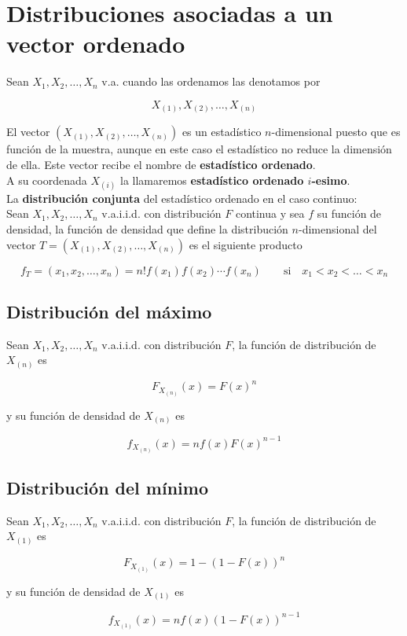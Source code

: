 \section{Distribuciones asociadas a un vector ordenado}


Sean $X_1, X_2, \dots, X_n$ v.a. cuando las ordenamos las denotamos por

\[ X_{(1)}, X_{(2)}, \dots, X_{(n)} \]

El vector $(X_{(1)}, X_{(2)}, \dots, X_{(n)})$ es un estadístico $n$-dimensional puesto que es función de la muestra, aunque en este caso el estadístico
no reduce la dimensión de ella. Este vector recibe el nombre de \textbf{estadístico ordenado}. \\
A su coordenada $X_{(i)}$ la llamaremos \textbf{estadístico ordenado $i$-esimo}. \\

La \textbf{distribución conjunta} del estadístico ordenado en el caso continuo: \\
Sean $X_1, X_2, \dots, X_n$ v.a.i.i.d. con distribución $F$ continua y sea $f$ su función de densidad, la función de densidad que define la distribución $n$-dimensional
del vector $T = (X_{(1)}, X_{(2)}, \dots, X_{(n)})$ es el siguiente producto

\[ f_T=(x_1, x_2, \dots, x_n) = n!f(x_1)f(x_2)\dotsb f(x_n) \qquad \text{si} \quad x_1 < x_2 < \dots < x_n \]

\subsection{Distribución del máximo}

Sean $X_1, X_2, \dots, X_n$ v.a.i.i.d. con distribución $F$, la función de distribución de $X_{(n)}$ es

\[ F_{X_{(n)}}(x)=F(x)^n \]

y su función de densidad de $X_{(n)}$ es

\[ f_{X_{(n)}}(x)=nf(x)F(x)^{n-1} \]

\newpage

\subsection{Distribución del mínimo}

Sean $X_1, X_2, \dots, X_n$ v.a.i.i.d. con distribución $F$, la función de distribución de $X_{(1)}$ es

\[ F_{X_{(1)}}(x)=1 - (1 - F(x))^n \]

y su función de densidad de $X_{(1)}$ es

\[ f_{X_{(1)}}(x)=nf(x)(1 - F(x))^{n-1} \]

